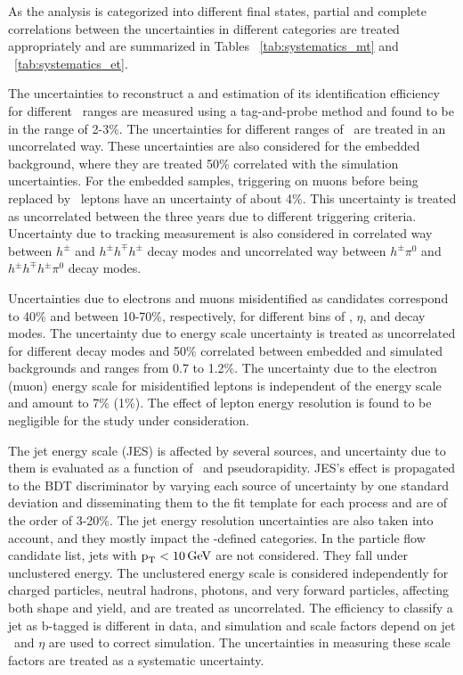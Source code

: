 As the analysis is categorized into different final states, partial and complete correlations between the uncertainties in different categories are treated appropriately and are summarized in Tables ~\ref{tab:systematics_mt} and ~\ref{tab:systematics_et}.




The uncertainties to reconstruct a \tauh and estimation of its identification efficiency for different \pt\, ranges are measured using a tag-and-probe method and found to be in the range of 2-3\%. The uncertainties for different ranges of \pt\, are treated in an uncorrelated way. These uncertainties are also considered for the embedded \Pgt{}\Pgt\, background, where they are treated 50\% correlated with the simulation uncertainties. For the embedded samples, triggering on muons before being replaced by \Pgt\, leptons have an uncertainty of about 4\%. This uncertainty is treated as uncorrelated between the three years due to different triggering criteria. Uncertainty due to tracking measurement is also considered in correlated way between $h^{\pm}$ and $h^{\pm}h^{\mp}h^{\pm}$ decay modes and uncorrelated way between $h^{\pm}\pi^{0}$ and $h^{\pm}h^{\mp}h^{\pm}\pi^{0}$ decay modes.

Uncertainties due to electrons and muons misidentified as \tauh candidates correspond to 40\% and between 10-70\%, respectively, for different bins of \pt, $\eta$, and \tauh decay modes. The uncertainty due to \tauh energy scale uncertainty is treated as uncorrelated for different decay modes and 50\% correlated between embedded and simulated backgrounds and ranges from 0.7 to 1.2\%. The uncertainty due to the electron (muon) energy scale for misidentified leptons is independent of the \tauh energy scale and amount to 7\% (1\%). The effect of lepton energy resolution is found to be negligible for the study under consideration.

The jet energy scale (JES) is affected by several sources, and uncertainty due to them is evaluated as a function of \pt\, and pseudorapidity. JES's effect is propagated to the BDT discriminator by varying each source of uncertainty by one standard deviation and disseminating them to the fit template for each process and are of the order of 3-20\%. The jet energy resolution uncertainties are also taken into account, and they mostly impact the \mjj-defined categories. In the particle flow candidate list, jets with $\text{p}_\text{T} < 10\,\text{Ge\hspace{-.08em}V}$ are not considered. They fall under unclustered energy. The unclustered energy scale is considered independently for charged particles, neutral hadrons, photons, and very forward particles, affecting both shape and yield, and are treated as uncorrelated. The efficiency to classify a jet as b-tagged is different in data, and simulation and scale factors depend on jet \pt\, and $ \eta $ are used to correct simulation. The uncertainties in measuring these scale factors are treated as a systematic uncertainty.

